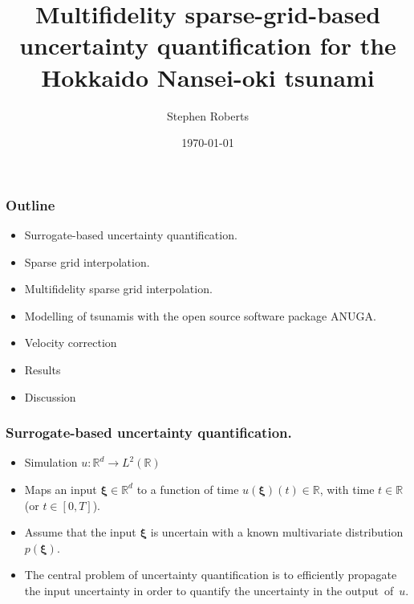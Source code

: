 \documentclass[11pt,ucs]{beamer}
\title[Multifidelity]{Multifidelity sparse-grid-based uncertainty quantification for the Hokkaido Nansei-oki tsunami}
\author[Roberts, Stephen] %
{Stephen Roberts%
}
\institute[ANU] %
{
  Mathematical Sciences Institute\\
  College of Physical and Mathematical Sciences\\
  Australian National University
}
\date{\today}
\begin{document}
\begin{frame}
  \titlepage
\end{frame}


\begin{frame}\frametitle{Outline}

\begin{itemize}



\item Surrogate-based uncertainty quantification. 

\item Sparse grid interpolation.

\item Multifidelity sparse grid interpolation.

\item Modelling of tsunamis with the open source software package ANUGA. 

\item Velocity correction

\item Results 

\item Discussion


\end{itemize}

\end{frame}






\begin{frame}\frametitle{Surrogate-based uncertainty quantification. }

\begin{itemize}
\item Simulation $u : \mathbb{R}^{d} \rightarrow L^2(\mathbb{R})$ 

\item Maps an input $\boldsymbol{\xi} \in \mathbb{R}^d$ to a function of time $u(\boldsymbol{\xi})(t) \in \mathbb{R}$, with time $t\in\mathbb{R}$ (or $t \in [0,T]$). 

\item Assume that the input $\boldsymbol{\xi}$ is uncertain with a known multivariate distribution $p(\boldsymbol{\xi})$. 

\item The central problem of uncertainty quantification is to efficiently propagate the input uncertainty in order to quantify the uncertainty in the \mbox{output of $u$.}

\end{itemize}

\end{frame}
\end{document}
